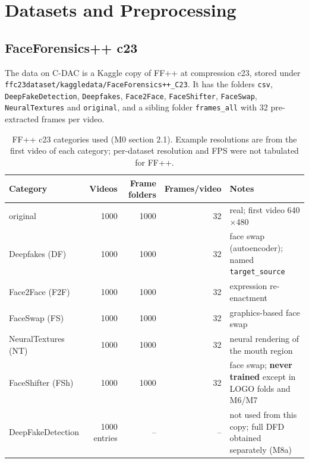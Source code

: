 \documentclass[10pt,a4paper]{article}
\begin{document}
\section{Datasets and Preprocessing}\label{sec:data}

\subsection{FaceForensics++ c23}
The data on C-DAC is a Kaggle copy of FF++ at compression c23, stored under
\texttt{ffc23dataset/kaggledata/}\allowbreak\texttt{FaceForensics++\_C23}. It has the folders
\texttt{csv}, \texttt{DeepFakeDetection}, \texttt{Deepfakes}, \texttt{Face2Face},
\texttt{FaceShifter}, \texttt{FaceSwap}, \texttt{NeuralTextures} and \texttt{original}, and a
sibling folder \texttt{frames\_all} with 32 pre-extracted frames per video.

\begin{table}[H]\centering\small
\caption{FF++ c23 categories used (M0 section 2.1). Example resolutions are from the first video of each category; per-dataset resolution and FPS were not tabulated for FF++.}\label{tab:ffpp}
\begin{tabularx}{\linewidth}{@{}lrrrY@{}}
\toprule
Category & Videos & Frame folders & Frames/video & Notes\\
\midrule
original & 1000 & 1000 & 32 & real; first video 640\(\times\)480\\
Deepfakes (DF) & 1000 & 1000 & 32 & face swap (autoencoder); named \texttt{target\_source}\\
Face2Face (F2F) & 1000 & 1000 & 32 & expression re-enactment\\
FaceSwap (FS) & 1000 & 1000 & 32 & graphics-based face swap\\
NeuralTextures (NT) & 1000 & 1000 & 32 & neural rendering of the mouth region\\
FaceShifter (FSh) & 1000 & 1000 & 32 & face swap; \textbf{never trained} except in LOGO folds and M6/M7\\
DeepFakeDetection & 1000 entries & -- & -- & not used from this copy; full DFD obtained separately (M8a)\\
\bottomrule
\end{tabularx}
\end{table}
\end{document}
